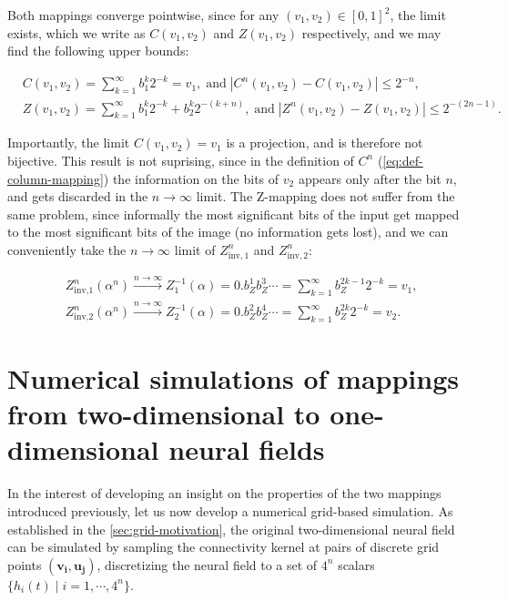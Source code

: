 \documentclass[10pt,letterpaper]{article}
\renewcommand{\vec}[1]{\boldsymbol{#1}}
\begin{document}
Both mappings converge pointwise, since for any $(v_1,v_2) \in [0,1]^2$, the limit exists, which we write as $C(v_1,v_2)$ and $Z(v_1,v_2)$ respectively, and we may find the following upper bounds:

\begin{equation} \begin{aligned}
& C(v_1,v_2) = \sum_{k=1}^\infty b_1^k 2^{-k} = v_1, \;\text{and}\; |C^n(v_1,v_2)-C(v_1,v_2)| \leq 2^{-n},\\
& Z(v_1,v_2) = \sum_{k=1}^\infty b_1^k 2^{-k} + b_2^k 2^{-(k+n)}, \;\text{and}\; |Z^n(v_1,v_2)-Z(v_1,v_2)|\leq 2^{-(2n-1)}.
\end{aligned} \end{equation}

Importantly, the limit $C(v_1,v_2)=v_1$ is a projection, and is therefore not bijective. This result is not suprising, since in the definition of $C^n$ (\autoref{eq:def-column-mapping}) the information on the bits of $v_2$ appears only after the bit $n$, and gets discarded in the $n \to \infty$ limit. The Z-mapping does not suffer from the same problem, since informally the most significant bits of the input get mapped to the most significant bits of the image (no information gets lost), and we can conveniently take the $n \to \infty$ limit of $Z_{\textrm{inv},1}^n$ and $Z_{\textrm{inv},2}^n$:

\begin{equation} \begin{aligned}
&Z_{\textrm{inv,1}}^n(\alpha^n) \xrightarrow{n \to \infty} Z^{-1}_1(\alpha) = 0.b_Z^1 b_Z^3 \cdots = \sum_{k=1}^\infty b_Z^{2k-1} 2^{-k} = v_1,\\
&Z_{\textrm{inv,2}}^n(\alpha^n) \xrightarrow{n \to \infty} Z^{-1}_2(\alpha) = 0.b_Z^2 b_Z^4 \cdots = \sum_{k=1}^\infty b_Z^{2k} 2^{-k} = v_2.
\end{aligned} \end{equation}

\section{Numerical simulations of mappings from two-dimensional to one-dimensional neural fields}

In the interest of developing an insight on the properties of the two mappings introduced previously, let us now develop a numerical grid-based simulation.
As established in the \autoref{sec:grid-motivation}, the original two-dimensional neural field can be simulated by sampling the connectivity kernel at pairs of discrete grid points $(\vec{v_i},\vec{u_j})$, discretizing the neural field to a set of $4^n$ scalars $\{h_i(t) \;|\; i=1,\cdots,4^n\}$.
\end{document}

